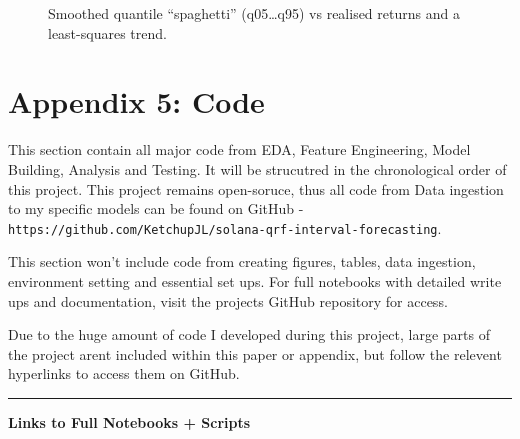 \documentclass[
  a4paper,
  DIV=11,
  numbers=noendperiod]{scrreprt}
\begin{document}
\begin{figure}


\caption{\label{fig-quantile-spaghetti}Smoothed quantile ``spaghetti''
(q05\ldots q95) vs realised returns and a least-squares trend.}

\end{figure}%

\chapter{Appendix 5: Code}\label{appendix-5-code}

This section contain all major code from EDA, Feature Engineering, Model
Building, Analysis and Testing. It will be strucutred in the
chronological order of this project. This project remains open-soruce,
thus all code from Data ingestion to my specific models can be found on
GitHub -
\texttt{https://github.com/KetchupJL/solana-qrf-interval-forecasting}.

This section won't include code from creating figures, tables, data
ingestion, environment setting and essential set ups. For full notebooks
with detailed write ups and documentation, visit the projects GitHub
repository for access.

Due to the huge amount of code I developed during this project, large
parts of the project arent included within this paper or appendix, but
follow the relevent hyperlinks to access them on GitHub.

\begin{center}\rule{0.5\linewidth}{0.5pt}\end{center}

\textbf{Links to Full Notebooks + Scripts}
\end{document}
